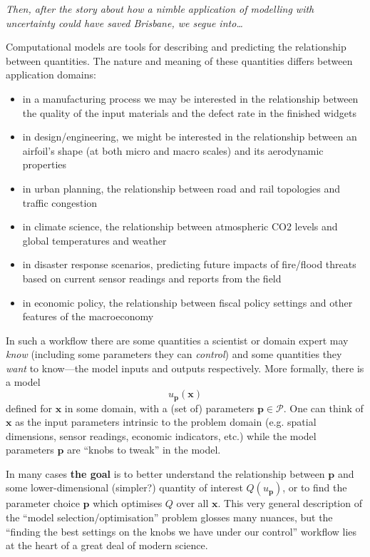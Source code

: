 \documentclass[a4paper,fontsize=12pt]{scrartcl}
\begin{document}
\emph{Then, after the story about how a nimble application of
  modelling with uncertainty could have saved Brisbane, we segue
  into\ldots}

Computational models are tools for describing and predicting the
relationship between quantities. The nature and meaning of these
quantities differs between application domains:
\begin{itemize}
\item in a manufacturing process we may be interested in the
  relationship between the quality of the input materials and the
  defect rate in the finished widgets
\item in design/engineering, we might be interested in the
  relationship between an airfoil's shape (at both micro and macro
  scales) and its aerodynamic properties
\item in urban planning, the relationship between road and rail
  topologies and traffic congestion
\item in climate science, the relationship between atmospheric CO2
  levels and global temperatures and weather
\item in disaster response scenarios, predicting future impacts of
  fire/flood threats based on current sensor readings and reports from
  the field
\item in economic policy, the relationship between fiscal policy
  settings and other features of the macroeconomy
\end{itemize}
In such a workflow there are some quantities a scientist or domain
expert may \emph{know} (including some parameters they can
\emph{control}) and some quantities they \emph{want} to know---the
model inputs and outputs respectively. More formally, there is a model
\begin{equation}
  \label{eq:1}
  u_{\mathbf{p}}(\mathbf{x})
\end{equation}
defined for $\mathbf{x}$ in some domain, with a (set of) parameters
$\mathbf{p} \in \mathcal{P}$. One can think of $\mathbf{x}$ as the input
parameters intrinsic to the problem domain (e.g. spatial dimensions,
sensor readings, economic indicators, etc.) while the model parameters $\mathbf{p}$
are ``knobs to tweak'' in the model.


In many cases \textbf{the goal} is to better understand the
relationship between $\mathbf{p}$ and some lower-dimensional
(simpler?) quantity of interest $Q(u_{\mathbf{p}})$, or to find the
parameter choice $\mathbf{p}$ which optimises $Q$ over all
$\mathbf{x}$. This very general description of the ``model
selection/optimisation'' problem glosses many nuances, but the
``finding the best settings on the knobs we have under our control''
workflow lies at the heart of a great deal of modern science.
\end{document}
